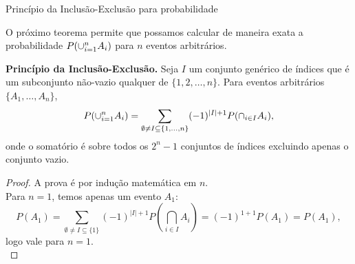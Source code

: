 \begin{frame}{Princípio da Inclusão-Exclusão para probabilidade}
	
	O próximo teorema permite que possamos calcular de maneira exata a
	probabilidade $P(\cup_{i=1}^{n}A_i)$ para $n$ eventos arbitrários.
	
	\begin{teo} {\bf Princípio da Inclusão-Exclusão.}  Seja $I$ um conjunto
	genérico de índices que é um subconjunto não-vazio qualquer de
	$\{1,2,\ldots,n\}$. Para eventos arbitrários $\{A_1,\ldots,A_n\}$,
	$$P(\cup_{i=1}^{n}A_i)=\sum_{\emptyset\ne I\subseteq \{1,\ldots, n\}}(-1)^{|I|+1}P(\cap_{i\in I}A_i),$$
	onde o somatório é sobre todos os $2^n-1$ conjuntos de índices
	excluindo apenas o conjunto vazio. \end{teo}
	
	\begin{proof} A prova é por indução matemática em $n$. 
		\\	
		Para \( n = 1 \), temos apenas um evento \( A_1 \):
		\[
		P(A_1) = \sum_{\emptyset \ne I \subseteq \{1\}} (-1)^{|I|+1} P\left( \bigcap_{i \in I} A_i \right) = (-1)^{1+1} P(A_1) = P(A_1),
		\] logo vale para \( n = 1 \).	
		\\
	
	\end{proof}
	
	
%	
\end{frame}

